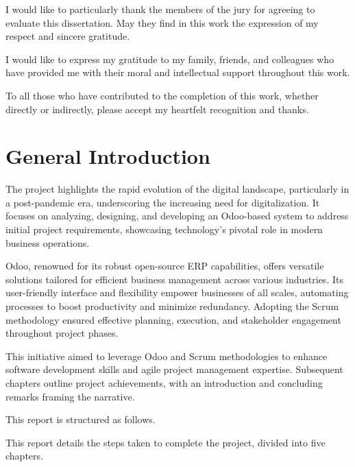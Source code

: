 \documentclass[12pt,a4paper,table]{report}
\begin{document}
I would like to particularly thank the members of the jury for agreeing to evaluate this dissertation. May they find in this work the expression of my respect and sincere gratitude.

I would like to express my gratitude to my family, friends, and colleagues who have provided me with their moral and intellectual support throughout this work.

To all those who have contributed to the completion of this work, whether directly or indirectly, please accept my heartfelt recognition and thanks.
\vspace{1cm}
\thispagestyle{empty}

\newpage
\dominitoc
\tableofcontents
\thispagestyle{empty}
\newpage
\listoftables
\thispagestyle{empty}
\newpage
\listoffigures
\thispagestyle{empty}
\newpage

\thispagestyle{empty}

\chapter*{\centering General Introduction}


The project highlights the rapid evolution of the digital landscape, particularly in a post-pandemic era, underscoring the increasing need for digitalization. It focuses on analyzing, designing, and developing an Odoo-based system to address initial project requirements, showcasing technology's pivotal role in modern business operations.

Odoo, renowned for its robust open-source ERP \cite{erp} capabilities, offers versatile solutions tailored for efficient business management across various industries. Its user-friendly interface and flexibility empower businesses of all scales, automating processes to boost productivity and minimize redundancy. Adopting the Scrum methodology ensured effective planning, execution, and stakeholder engagement throughout project phases.

This initiative aimed to leverage Odoo and Scrum methodologies to enhance software development skills and agile \cite{agile} project management expertise. Subsequent chapters outline project achievements, with an introduction and concluding remarks framing the narrative.

This report is structured as follows.

This report details the steps taken to complete the project, divided into five chapters.
\end{document}
